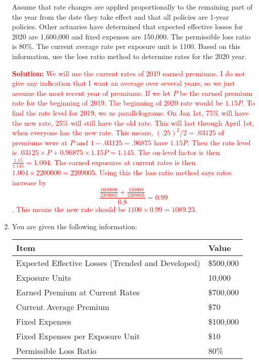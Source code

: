 \documentclass{article}
\begin{document}
\begin{enumerate}
Assume that rate changes are applied proportionally to the remaining part of the year from the date they take effect and that all policies are 1-year policies. Other actuaries have determined that expected effective losses for 2020 are 1,600,000 and fixed expenses are 150,000. The permissible loss ratio is 80\%. The current average rate per exposure unit is 1100. Based on this information, use the loss ratio method to determine rates for the 2020 year. 

\textcolor{red}{\textbf{Solution:}
We will use the current rates of 2019 earned premiums. I do not give any indication that I want an average over several years, so we just assume the most recent year of premiums. If we let $P$ be the earned premium rate for the beginning of 2019. The beginning of 2020 rate would be $1.15P$. To find the rate level for 2019, we us parallelograms. On Jan 1st, 75\% will have the new rate, 25\% will still have the old rate. This will last through April 1st, when everyone has the new rate. This means, $(.25)^2/2 = .03125$ of premiums were at $P$ and $1 - .03125 = .96875$ have $1.15P$. Then the rate level is $.03125 \times P + 0.96875 \times 1.15 P = 1.145$. The on-level factor is then $\frac{1.15}{1.145} = 1.004$. The earned exposures at current rates is then $1.004 \times 2200000 = 2209005$. Using this the loss ratio method says rates increase by \[\frac{\frac{1600000}{2209005} + \frac{150000}{2209005}}{0.8} = 0.99\]. This means the new rate should be $1100 \times 0.99 = 1089.23$. }

\item 
You are given the following information:

\begin{table}[htbp]
\centering
\begin{tabular}{@{}ll@{}}
\toprule
\textbf{Item}                          & \textbf{Value}              \\ \midrule
Expected Effective Losses (Trended and Developed)    & \$500,000                   \\
Exposure Units                         & 10,000                      \\
Earned Premium at Current Rates        & \$700,000                   \\
Current Average Premium                & \$70                        \\
Fixed Expenses                         & \$100,000                   \\
Fixed Expenses per Exposure Unit       & \$10                        \\
Permissible Loss Ratio                 & 80\%                        \\ \bottomrule
\end{tabular}
\end{table}


\end{enumerate}
\end{document}
